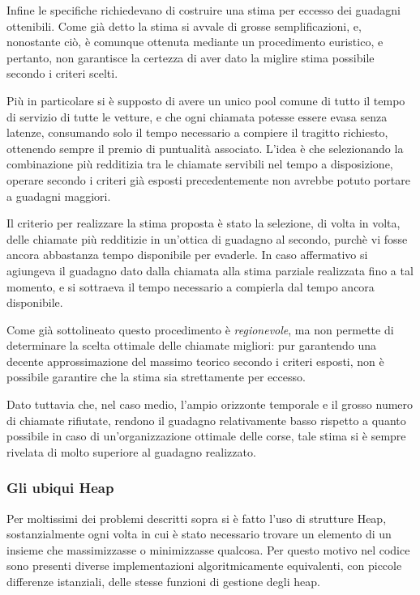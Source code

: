 \documentclass[a4paper,11pt]{Article}
\begin{document}
Infine le specifiche richiedevano di costruire una stima per eccesso dei guadagni ottenibili. Come già detto la stima si avvale di grosse semplificazioni, e, nonostante ciò, è comunque ottenuta mediante un procedimento euristico, e pertanto, non garantisce la certezza di aver dato la miglire stima possibile secondo i criteri scelti.

Più in particolare si è supposto di avere un unico pool comune di tutto il tempo di servizio di tutte le vetture, e che ogni chiamata potesse essere evasa senza latenze, consumando solo il tempo necessario a compiere il tragitto richiesto, ottenendo sempre il premio di puntualità associato.
L'idea è che selezionando la combinazione più redditizia tra le chiamate servibili nel tempo a disposizione, operare secondo i criteri già esposti precedentemente non avrebbe potuto portare a guadagni maggiori.

Il criterio per realizzare la stima proposta è stato la selezione, di volta in volta, delle chiamate più redditizie in un'ottica di guadagno al secondo, purchè vi fosse ancora abbastanza tempo disponibile per evaderle. In caso affermativo si agiungeva il guadagno dato dalla chiamata alla stima parziale realizzata fino a tal momento, e si sottraeva il tempo necessario a compierla dal tempo ancora disponibile.

Come già sottolineato questo procedimento è \textit{regionevole}, ma non permette di determinare la scelta ottimale delle chiamate migliori: pur garantendo una decente approssimazione del massimo teorico secondo i criteri esposti, non è possibile garantire che la stima sia strettamente per eccesso.

Dato tuttavia che, nel caso medio, l'ampio orizzonte temporale e il grosso numero di chiamate rifiutate, rendono il guadagno relativamente basso rispetto a quanto possibile in caso di un'organizzazione ottimale delle corse, tale stima si è sempre rivelata di molto superiore al guadagno realizzato.

\subsubsection{Gli ubiqui Heap}
Per moltissimi dei problemi descritti sopra si è fatto l'uso di strutture Heap, sostanzialmente ogni volta in cui è stato necessario trovare un elemento di un insieme che massimizzasse o minimizzasse qualcosa. Per questo motivo nel codice sono presenti diverse implementazioni algoritmicamente equivalenti, con piccole differenze istanziali, delle stesse funzioni di gestione degli heap.
\end{document}
